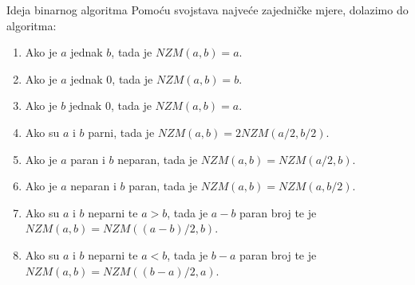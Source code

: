 \documentclass[xcolor=dvipsnames, notheorems]{beamer}
\theoremstyle{plain} %
\theoremstyle{definition} %
\begin{document}
\begin{frame}{Ideja binarnog algoritma}
Pomoću svojstava najveće zajedničke mjere, dolazimo do algoritma:
\begin{enumerate}
\item Ako je $a$ jednak $b$, tada je $NZM(a,b) = a$.\\
\item Ako je $a$ jednak $0$, tada je $NZM(a,b) = b$. \\
\item Ako je $b$ jednak $0$, tada je $NZM(a,b) = a$.\\
\item Ako su $a$ i $b$ parni, tada je $NZM(a,b) = 2 NZM(a/2, b/2)$.\\
\item Ako je $a$ paran i $b$ neparan, tada je $NZM(a,b) = NZM(a/2, b)$.\\
\item Ako je $a$ neparan i $b$ paran, tada je $NZM(a,b) = NZM(a, b/2)$.\\
\item Ako su $a$ i $b$ neparni te $a > b$, tada je $a - b$ paran broj te je $NZM(a,b) = NZM((a-b)/2,b)$.\\
\item Ako su $a$ i $b$ neparni te $a < b$, tada je $b - a$ paran broj te je $NZM(a,b) = NZM((b-a)/2,a)$.
\end{enumerate}
\end{frame}
\end{document}
